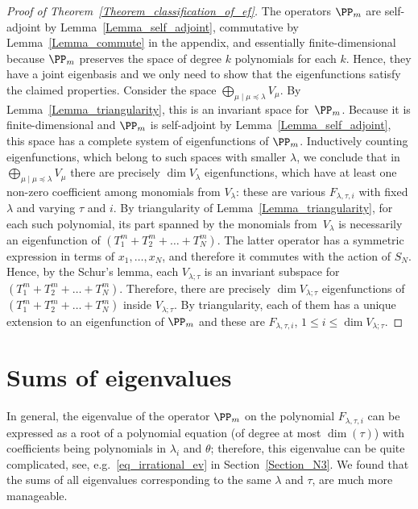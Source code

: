 \begin{proof}[Proof of Theorem~\ref{Theorem_classification_of_ef}] The operators $\PP_m$ are self-adjoint by Lemma~\ref{Lemma_self_adjoint}, commutative by Lemma~\ref{Lemma_commute} in the appendix, and essentially finite-dimensional because $\PP_m$ preserves the space of degree $k$ polynomials for each $k$. Hence, they have a joint eigenbasis and we only need to show that the eigenfunctions satisfy the claimed properties.  Consider the space $\bigoplus\limits_{\mu\mid \mu\preceq \lambda} V_{\mu}$. By Lemma~\ref{Lemma_triangularity}, this is an invariant space for~$\PP_m$. Because it is finite-dimensional and $\PP_m$ is self-adjoint by Lemma~\ref{Lemma_self_adjoint}, this space has a complete system of eigenfunctions of $\PP_m$. Inductively counting eigenfunctions, which belong to such spaces with smaller $\lambda$, we conclude that in $\bigoplus\limits_{\mu\mid \mu\preceq \lambda} V_{\mu}$ there are precisely $\dim V_\lambda$ eigenfunctions, which have at least one non-zero coefficient among monomials from $V_\lambda$: these are various $F_{\lambda,\tau,i}$ with fixed $\lambda$ and varying $\tau$ and $i$. By triangularity of Lemma~\ref{Lemma_triangularity}, for each such polynomial, its part spanned by the monomials from~$V_\lambda$ is necessarily an eigenfunction of $(T_1^m+T_2^m+\dots+T_N^m)$. The latter operator has a symmetric expression in terms of $x_1,\dots,x_N$, and therefore it commutes with the action of $S_N$. Hence, by the Schur's lemma, each $V_{\lambda;\tau}$ is an invariant subspace for $(T_1^m+T_2^m+\dots+T_N^m)$. Therefore, there are precisely $\dim V_{\lambda;\tau}$ eigenfunctions of $(T_1^m+T_2^m+\dots+T_N^m)$ inside $V_{\lambda;\tau}$. By triangularity, each of them has a unique extension to an eigenfunction of $\PP_m$ and these are $F_{\lambda,\tau,i}$, $1\le i \le \dim V_{\lambda;\tau}$.
\end{proof}

\section{Sums of eigenvalues}

\label{Section_sums}

In general, the eigenvalue of the operator $\PP_m$ on the polynomial $F_{\lambda,\tau,i}$ can be expressed as a root of a polynomial equation (of degree at most $\dim(\tau)$) with coefficients being polynomials in $\lambda_i$ and $\theta$; therefore, this eigenvalue can be quite complicated, see, e.g.~\eqref{eq_irrational_ev} in Section~\ref{Section_N3}. We found that the sums of all eigenvalues corresponding to the same $\lambda$ and $\tau$, are much more manageable.


